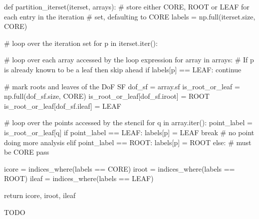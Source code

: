 \documentclass[thesis]{subfiles}
\begin{document}
\begin{algorithm}
  \begin{center}
    \begin{minipage}{.9\textwidth}
      \begin{pyalg2}
        def partition_iterset(iterset, arrays):
          # store either CORE, ROOT or LEAF for each entry in the iteration
          # set, defaulting to CORE
          labels = np.full(iterset.size, CORE)

          # loop over the iteration set
          for p in iterset.iter():

            # loop over each array accessed by the loop expression
            for array in arrays:
              # If p is already known to be a leaf then skip ahead
              if labels[p] == LEAF:
                continue

              # mark roots and leaves of the DoF SF
              dof_sf = array.sf
              is_root_or_leaf = np.full(dof_sf.size, CORE)
              is_root_or_leaf[dof_sf.iroot] = ROOT
              is_root_or_leaf[dof_sf.ileaf] = LEAF

              # loop over the points accessed by the stencil
              for q in array.iter():
                point_label = is_root_or_leaf[q]
                if point_label == LEAF:
                  labels[p] = LEAF
                  break  # no point doing more analysis
                elif point_label == ROOT:
                  labels[p] = ROOT
                else:
                  # must be CORE
                  pass

          icore = indices_where(labels == CORE)
          iroot = indices_where(labels == ROOT)
          ileaf = indices_where(labels == LEAF)

          return icore, iroot, ileaf
      \end{pyalg2}
    \end{minipage}
  \end{center}

  \caption{
    TODO
  }
  \label{alg:partition_iterset}
\end{algorithm}
\end{document}
